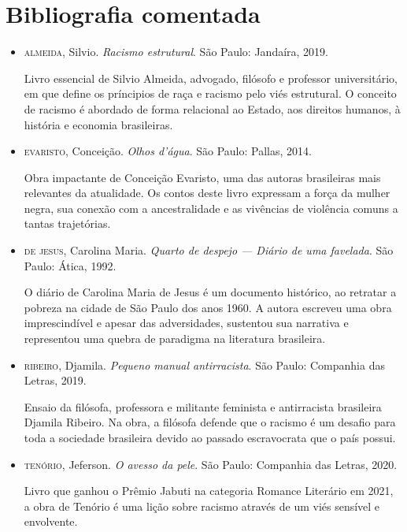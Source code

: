 \documentclass[11pt]{extarticle}
\begin{document}
\section{Bibliografia comentada}

\begin{itemize}

\item \textsc{almeida}, Silvio. \textit{Racismo estrutural}. São Paulo: Jandaíra, 2019.

Livro essencial de Silvio Almeida, advogado, filósofo e professor universitário, em que define os príncipios de raça e racismo pelo viés estrutural. O conceito de racismo é abordado de forma relacional ao Estado, aos direitos humanos, à história e economia brasileiras.

\item \textsc{evaristo}, Conceição. \textit{Olhos d'água}. São Paulo: Pallas, 2014.

Obra impactante de Conceição Evaristo, uma das autoras brasileiras mais relevantes da atualidade. Os contos deste livro expressam a força da mulher negra, sua conexão com a ancestralidade e as vivências de violência comuns a tantas trajetórias.

\item \textsc{de jesus}, Carolina Maria. \textit{Quarto de despejo — Diário de uma favelada}. São Paulo: Ática, 1992.

O diário de Carolina Maria de Jesus é um documento histórico, ao retratar a pobreza na cidade de São Paulo dos anos 1960. A autora escreveu uma obra imprescindível e apesar das adversidades, sustentou sua narrativa e representou uma quebra de paradigma na literatura brasileira.

\item \textsc{ribeiro}, Djamila. \textit{Pequeno manual antirracista}. São Paulo: Companhia das Letras, 2019. 

Ensaio da filósofa, professora e militante feminista e antirracista brasileira Djamila Ribeiro. Na obra, a filósofa defende que o racismo é um desafio para toda a sociedade brasileira devido ao passado escravocrata que o país possui. 

\item \textsc{tenório}, Jeferson. \textit{O avesso da pele}. São Paulo: Companhia das Letras, 2020.

Livro que ganhou o Prêmio Jabuti na categoria Romance Literário em 2021, a obra de Tenório é uma lição sobre racismo através de um viés sensível e envolvente. 

\end{itemize}
\end{document}
